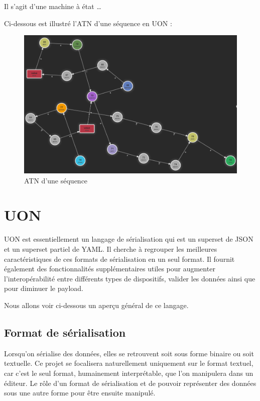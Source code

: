 \documentclass[
    iict, %
    il, %
]{heig-tb}
\begin{document}
Il s'agit d'une machine à état \dots

Ci-dessous est illustré l'ATN d'une séquence en UON :

\begin{figure}[!ht]
    \begin{center}
        \includegraphics[width=12cm]{assets/figures/seq_ATN.png}
    \end{center}
    \caption[ATN d'une séquence]{\label{seq_ATN} ATN d'une séquence}
\end{figure}


\section{UON}
UON est essentiellement un langage de sérialisation qui est un superset de JSON et un superset partiel de YAML.
Il cherche à regrouper les meilleures caractéristiques de ces formats de sérialisation en un seul format.
Il fournit également des fonctionnalités supplémentaires utiles pour augmenter l'interopérabilité entre différents types de dispositifs, valider les données ainsi que pour diminuer le payload.

Nous allons voir ci-dessous un aperçu général de ce langage.

\subsection{Format de sérialisation}

Lorsqu'on sérialise des données, elles se retrouvent soit sous forme binaire ou soit textuelle.
Ce projet se focalisera naturellement uniquement sur le format textuel, car c'est le seul format, humainement interprétable, que l'on manipulera dans un éditeur.
Le rôle d'un format de sérialisation et de pouvoir représenter des données sous une autre forme pour être ensuite manipulé.
\end{document}

